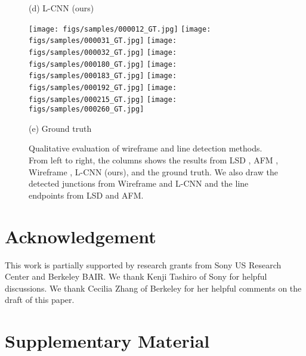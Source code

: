 \documentclass[10pt,twocolumn,letterpaper]{article}
\begin{document}
\begin{figure*}
\begin{minipage}[t]{0.19\linewidth}
    (d) L-CNN (ours)
    \end{minipage}\hfill
    \begin{minipage}[t]{0.19\linewidth}\centering
    \texttt{[image: figs/samples/000012\_GT.jpg]}
    \texttt{[image: figs/samples/000031\_GT.jpg]}
    \texttt{[image: figs/samples/000032\_GT.jpg]}
    \texttt{[image: figs/samples/000180\_GT.jpg]}
    \texttt{[image: figs/samples/000183\_GT.jpg]}
    \texttt{[image: figs/samples/000192\_GT.jpg]}
    \texttt{[image: figs/samples/000215\_GT.jpg]}
    \texttt{[image: figs/samples/000260\_GT.jpg]}
    
    (e) Ground truth
    \end{minipage}\hfill
    
    \caption{Qualitative evaluation of wireframe and line detection methods.  From left to right, the columns shows the results from LSD \cite{von2010lsd}, AFM \cite{xue2018learning}, Wireframe \cite{Huang:2018:LPW}, L-CNN (ours), and the ground truth.  We also draw the detected junctions from Wireframe and L-CNN and the line endpoints from LSD and AFM.
    }
    \label{fig:qualitative}
\end{figure*}





\section*{Acknowledgement}
This work is partially supported by research grants from Sony US Research Center and Berkeley BAIR. We thank Kenji Tashiro of Sony for helpful discussions. We thank Cecilia Zhang of Berkeley for her helpful comments on the draft of this paper.  

\section{Supplementary Material}
\end{document}
